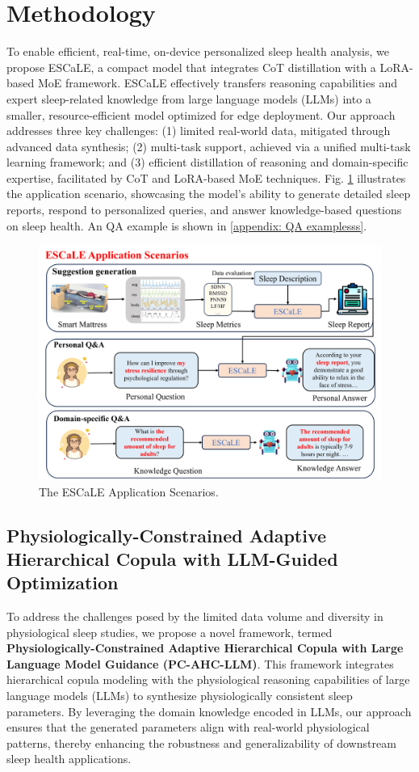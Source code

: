 \documentclass[preprint,12pt]{elsarticle}
\begin{document}
\section{Methodology}
To enable efficient, real-time, on-device personalized sleep health analysis, we propose ESCaLE, a compact model that integrates CoT distillation with a LoRA-based MoE framework. ESCaLE effectively transfers reasoning capabilities and expert sleep-related knowledge from large language models (LLMs) into a smaller, resource-efficient model optimized for edge deployment. Our approach addresses three key challenges: (1) limited real-world data, mitigated through advanced data synthesis; (2) multi-task support, achieved via a unified multi-task learning framework; and (3) efficient distillation of reasoning and domain-specific expertise, facilitated by CoT and LoRA-based MoE techniques.  Fig. \ref{fig5} illustrates the application scenario, showcasing the model’s ability to generate detailed sleep reports, respond to personalized queries, and answer knowledge-based questions on sleep health. An QA example is shown in \ref{appendix: QA examplesss}.
\begin{figure}[h]
\centerline{\includegraphics[width=\columnwidth]{applications.png}}
\caption{The ESCaLE Application Scenarios.}
\label{fig5}
\end{figure}

\subsection{Physiologically-Constrained Adaptive Hierarchical Copula with LLM-Guided Optimization}
To address the challenges posed by the limited data volume and diversity in physiological sleep studies, we propose a novel framework, termed \textbf{Physiologically-Constrained Adaptive Hierarchical Copula with Large Language Model Guidance (PC-AHC-LLM)}. This framework integrates hierarchical copula modeling with the physiological reasoning capabilities of large language models (LLMs) to synthesize physiologically consistent sleep parameters. By leveraging the domain knowledge encoded in LLMs, our approach ensures that the generated parameters align with real-world physiological patterns, thereby enhancing the robustness and generalizability of downstream sleep health applications. 
\end{document}
